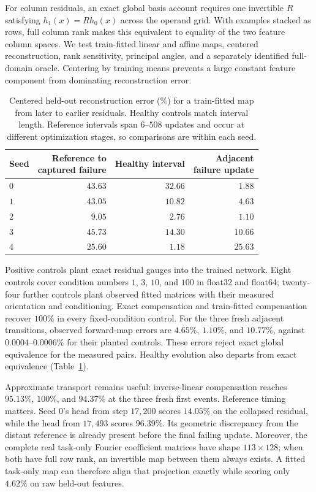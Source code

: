 For column residuals, an exact global basis account requires one invertible $R$ satisfying $h_1(x)=Rh_0(x)$ across the operand grid. With examples stacked as rows, full column rank makes this equivalent to equality of the two feature column spaces. We test train-fitted linear and affine maps, centered reconstruction, rank sensitivity, principal angles, and a separately identified full-domain oracle. Centering by training means prevents a large constant feature component from dominating reconstruction error.

\begin{table}[htbp]
\centering
\small
\caption{Centered held-out reconstruction error (\%) for a train-fitted map from later to earlier residuals. Healthy controls match interval length. Reference intervals span $6$--$508$ updates and occur at different optimization stages, so comparisons are within each seed.}
\label{tab:followup-geometry}
\begin{tabular}{lrrr}
\toprule
Seed & \shortstack{Reference to\\captured failure} & Healthy interval & \shortstack{Adjacent\\failure update} \\
\midrule
$0$ & $43.63$ & $32.66$ & $1.88$ \\
$1$ & $43.05$ & $10.82$ & $4.63$ \\
$2$ & $9.05$ & $2.76$ & $1.10$ \\
$3$ & $45.73$ & $14.30$ & $10.66$ \\
$4$ & $25.60$ & $1.18$ & $25.63$ \\
\bottomrule
\end{tabular}
\end{table}

Positive controls plant exact residual gauges into the trained network. Eight controls cover condition numbers $1$, $3$, $10$, and $100$ in float32 and float64; twenty-four further controls plant observed fitted matrices with their measured orientation and conditioning. Exact compensation and train-fitted compensation recover $100\%$ in every fixed-condition control. For the three fresh adjacent transitions, observed forward-map errors are $4.65\%$, $1.10\%$, and $10.77\%$, against $0.0004$--$0.0006\%$ for their planted controls. These errors reject exact global equivalence for the measured pairs. Healthy evolution also departs from exact equivalence (Table~\ref{tab:followup-geometry}).

Approximate transport remains useful: inverse-linear compensation reaches $95.13\%$, $100\%$, and $94.37\%$ at the three fresh first events. Reference timing matters. Seed $0$'s head from step $17{,}200$ scores $14.05\%$ on the collapsed residual, while the head from $17{,}493$ scores $96.39\%$. Its geometric discrepancy from the distant reference is already present before the final failing update. Moreover, the complete real task-only Fourier coefficient matrices have shape $113\times128$; when both have full row rank, an invertible map between them always exists. A fitted task-only map can therefore align that projection exactly while scoring only $4.62\%$ on raw held-out features.

